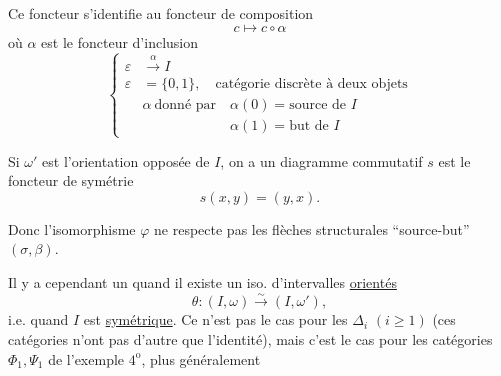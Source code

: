 
Ce foncteur s'identifie au foncteur de composition
\[ c\longmapsto c\circ\alpha \]
où $\alpha$ est le foncteur d'inclusion
\[ \left\{\begin{aligned}
\varepsilon&\xrightarrow{\alpha} I\\
\varepsilon&=\{0,1\},\quad\text{catégorie discrète à deux objets}\\
&\alpha\ \text{donné par}\quad \alpha(0)=\text{source de }I\\
&\phantom{\alpha\ \text{donné par}\quad}\alpha(1)=\text{but de }I
\end{aligned}\right. \]

\unsure{$\rightarrow$|,} Si $\omega'$ est l'orientation opposée de $I$, on a un diagramme commutatif
$s$ est le foncteur de symétrie
\[ s(x,y)=(y,x). \]

Donc l'isomorphisme $\varphi$ ne respecte pas les flèches structurales ``source-but'' $(\sigma,\beta)$.

Il y a cependant un  quand il existe un iso. d'intervalles \uline{orientés}
\[ \theta\colon(I,\omega)\xrightarrow{\sim}(I,\omega'), \]
i.e. quand $I$ est \uline{symétrique}. Ce n'est pas le cas pour les $\mathbb{\Delta}_i$ $(i\geq 1)$ (ces catégories n'ont pas d'autre  que l'identité), mais c'est le cas pour les catégories $\Phi_1,\Psi_1$ de l'exemple $4^{\mathrm{o}}$, plus généralement 
